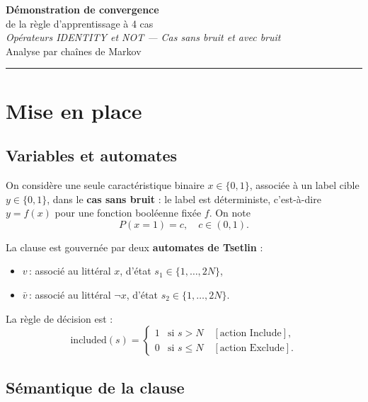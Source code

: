 \documentclass[12pt,a4paper]{article}
\theoremstyle{remark}
\newcommand{\Inc}{\ensuremath{\mathrm{Include}}}
\newcommand{\Exc}{\ensuremath{\mathrm{Exclude}}}
\newcommand{\vbar}{\bar{v}}
\begin{document}

\begin{center}
  {\LARGE\bfseries Démonstration de convergence}\\[6pt]
  {\large de la règle d'apprentissage à 4 cas}\\[4pt]
  {\large\itshape Opérateurs IDENTITY et NOT --- Cas sans bruit et avec bruit}\\[12pt]
  {\normalsize Analyse par chaînes de Markov}
\end{center}

\vspace{1em}
\hrule
\vspace{1.5em}

\tableofcontents

\newpage

\section{Mise en place}

\subsection{Variables et automates}

On considère une seule caractéristique binaire $x \in \{0,1\}$, associée à un label cible
$y \in \{0,1\}$, dans le \textbf{cas sans bruit} : le label est déterministe, c'est-à-dire $y = f(x)$
pour une fonction booléenne fixée $f$.  On note
\[
  P(x = 1) = c, \quad c \in (0,1).
\]

La clause est gouvernée par deux \textbf{automates de Tsetlin} :
\begin{itemize}
  \item $v$\,: associé au littéral $x$, d'état $s_1 \in \{1,\ldots,2N\}$,
  \item $\vbar$\,: associé au littéral $\neg x$, d'état $s_2 \in \{1,\ldots,2N\}$.
\end{itemize}
La règle de décision est :
\[
  \mathrm{included}(s) =
  \begin{cases} 1 & \text{si } s > N \quad [\text{action } \Inc], \\ 0 & \text{si } s \le N \quad [\text{action } \Exc]. \end{cases}
\]

\subsection{Sémantique de la clause}
\end{document}
